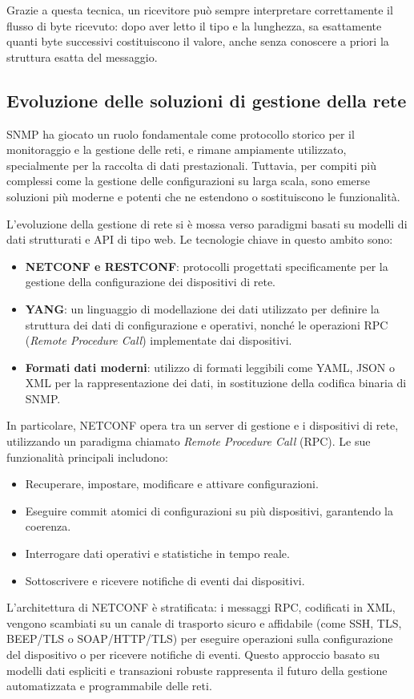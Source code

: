 Grazie a questa tecnica, un ricevitore può sempre interpretare correttamente il
flusso di byte ricevuto: dopo aver letto il tipo e la lunghezza, sa esattamente
quanti byte successivi costituiscono il valore, anche senza conoscere a priori
la struttura esatta del messaggio.

\subsection{Evoluzione delle soluzioni di gestione della rete}

SNMP ha giocato un ruolo fondamentale come protocollo storico per il monitoraggio
e la gestione delle reti, e rimane ampiamente utilizzato, specialmente per la
raccolta di dati prestazionali. Tuttavia, per compiti più complessi come la
gestione delle configurazioni su larga scala, sono emerse soluzioni più moderne
e potenti che ne estendono o sostituiscono le funzionalità.

L'evoluzione della gestione di rete si è mossa verso paradigmi basati su modelli
di dati strutturati e API di tipo web. Le tecnologie chiave in questo ambito sono:

\begin{itemize}
\item \textbf{NETCONF e RESTCONF}: protocolli progettati specificamente per la
gestione della configurazione dei dispositivi di rete.
\item \textbf{YANG}: un linguaggio di modellazione dei dati utilizzato per
definire la struttura dei dati di configurazione e operativi, nonché le
operazioni RPC (\textit{Remote Procedure Call}) implementate dai dispositivi.
\item \textbf{Formati dati moderni}: utilizzo di formati leggibili come YAML,
JSON o XML per la rappresentazione dei dati, in sostituzione della codifica
binaria di SNMP.
\end{itemize}

In particolare, NETCONF opera tra un server di gestione e i dispositivi di rete,
utilizzando un paradigma chiamato \textit{Remote Procedure Call} (RPC).
Le sue funzionalità principali includono:
\begin{itemize}
\item Recuperare, impostare, modificare e attivare configurazioni.
\item Eseguire commit atomici di configurazioni su più dispositivi,
garantendo la coerenza.
\item Interrogare dati operativi e statistiche in tempo reale.
\item Sottoscrivere e ricevere notifiche di eventi dai dispositivi.
\end{itemize}

L'architettura di NETCONF è stratificata: i messaggi RPC, codificati in XML,
vengono scambiati su un canale di trasporto sicuro e affidabile (come SSH, TLS,
BEEP/TLS o SOAP/HTTP/TLS) per eseguire operazioni sulla configurazione del
dispositivo o per ricevere notifiche di eventi. Questo approccio basato su
modelli dati espliciti e transazioni robuste rappresenta il futuro della gestione
automatizzata e programmabile delle reti.
